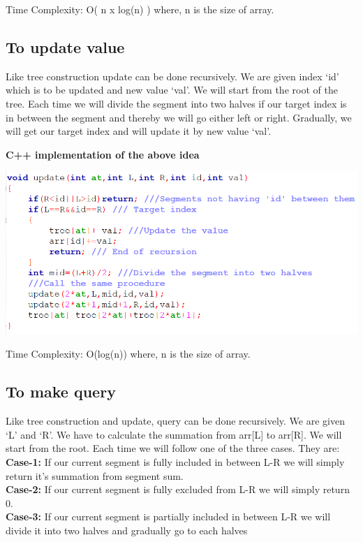 \documentclass[conference,column]{IEEEtran}
\begin{document}
Time Complexity: O( n x log(n) ) where, n is the size of array.

\subsection{\textbf{To update value}}



Like tree construction update can be done recursively. We are given index ‘id’ which is to be updated and new value ‘val’. We will start from the root of the tree. Each time we will divide the segment into two halves if our target index is in between the segment and thereby we will go either left or right.
Gradually, we will get our target index and will update it by new value ‘val’.



\textbf{C++ implementation of the above idea}
\begin{center}
\includegraphics[scale=0.50]{3.png}
\end{center}

Time Complexity: O(log(n)) where, n is the size of array.


\subsection{\textbf{To make query}}


Like tree construction and update, query can be done recursively. We are given ‘L’ and ‘R’. We have to calculate the summation from arr[L] to arr[R]. We will start from the root. Each time we will follow one of the three cases. They are:\\
\textbf{Case-1:} If our current segment is fully included in between L-R we will simply return it’s summation from segment sum. \\
\textbf{Case-2:} If our current segment is fully excluded from L-R we will simply return 0. \\
\textbf{Case-3:} If our current segment is partially included in between L-R we will divide it into two halves and gradually go to each halves
\end{document}
